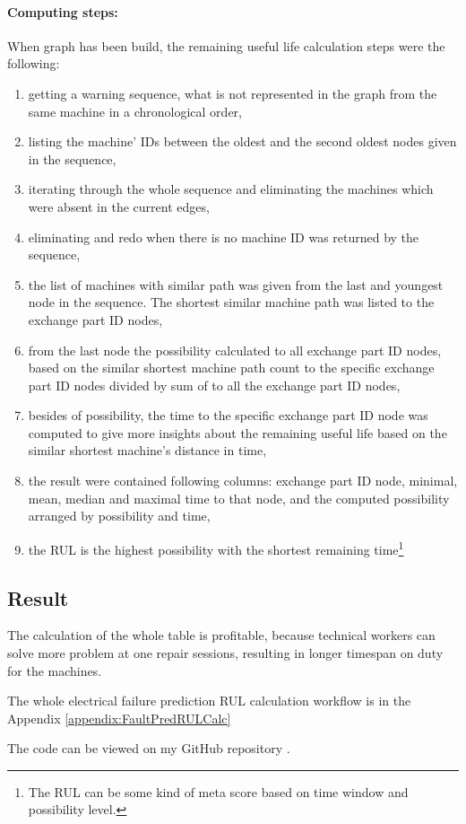 			\paragraph{Computing steps:}
			When graph has been build, the remaining useful life calculation steps were the following:
			\begin{enumerate}
				\item{getting a warning sequence, what is not represented in the graph from the same machine in a chronological order,}
				\item{listing the machine' IDs between the oldest and the second oldest nodes given in the sequence,}
				\item{iterating through the whole sequence and eliminating the machines which were absent in the current edges,}
				\item{eliminating and redo when there is no machine ID was returned by the sequence,}
				\item{the list of machines with similar path was given from the last and youngest node in the sequence. The shortest similar machine path was listed to the exchange part ID nodes,}
				\item{from the last node the possibility calculated to all exchange part ID nodes, based on the similar shortest machine path count to the specific exchange part ID nodes divided by sum of to all the exchange part ID nodes,}
				\item{besides of possibility, the time to the specific exchange part ID node was computed to give more insights about the remaining useful life based on the similar shortest machine's distance in time,}
				\item{the result were contained following columns: exchange part ID node, minimal, mean, median and maximal time to that node, and the computed possibility arranged by possibility and time,} 
		 		\item{the RUL is the highest possibility with the shortest remaining time\footnote{The RUL can be some kind of meta score based on time window and possibility level.}}
		 	\end{enumerate}
	\subsection{Result}
The calculation of the whole table is profitable, because technical workers can solve more problem at one repair sessions, resulting in longer timespan on duty for the machines.

The whole electrical failure prediction RUL calculation workflow is in the Appendix \ref{appendix:FaultPredRULCalc}

The code can be viewed on my GitHub repository \cite{GitHub_FP_RUL}.